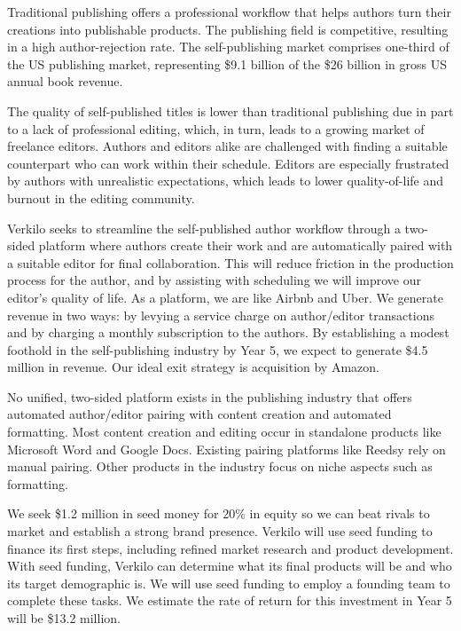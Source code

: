 \documentclass[11pt,openany]{book}
\begin{document}
Traditional publishing offers a professional workflow that helps authors
turn their creations into publishable products. The publishing field is
competitive, resulting in a high author-rejection rate. The
self-publishing market comprises one-third of the US publishing market,
representing \$9.1 billion of the \$26 billion in gross US annual book
revenue.

The quality of self-published titles is lower than traditional
publishing due in part to a lack of professional editing, which, in
turn, leads to a growing market of freelance editors. Authors and
editors alike are challenged with finding a suitable counterpart who can
work within their schedule. Editors are especially frustrated by authors
with unrealistic expectations, which leads to lower quality-of-life and
burnout in the editing community.

Verkilo seeks to streamline the self-published author workflow through a
two-sided platform where authors create their work and are automatically
paired with a suitable editor for final collaboration. This will reduce
friction in the production process for the author, and by assisting with
scheduling we will improve our editor's quality of life. As a platform,
we are like Airbnb and Uber. We generate revenue in two ways: by levying
a service charge on author/editor transactions and by charging a monthly
subscription to the authors. By establishing a modest foothold in the
self-publishing industry by Year 5, we expect to generate \$4.5 million
in revenue. Our ideal exit strategy is acquisition by Amazon.

No unified, two-sided platform exists in the publishing industry that
offers automated author/editor pairing with content creation and
automated formatting. Most content creation and editing occur in
standalone products like Microsoft Word and Google Docs. Existing
pairing platforms like Reedsy rely on manual pairing. Other products in
the industry focus on niche aspects such as formatting.

We seek \$1.2 million in seed money for 20\% in equity so we can beat
rivals to market and establish a strong brand presence. Verkilo will use
seed funding to finance its first steps, including refined market
research and product development. With seed funding, Verkilo can
determine what its final products will be and who its target demographic
is. We will use seed funding to employ a founding team to complete these
tasks. We estimate the rate of return for this investment in Year 5 will
be \$13.2 million.
\end{document}
